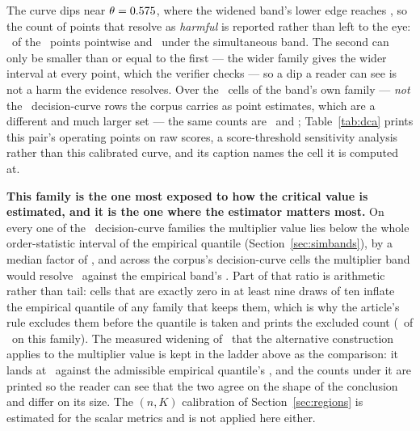 The curve dips near $\theta = 0.575$, where the widened band's
lower edge reaches \dcaDipValueWidened, so the count of points that resolve as
\emph{harmful} is reported rather than left to the eye:
\nHarmfulPointwise\ of the \nDcGrid\ points pointwise and
\nHarmfulSimultaneousWidened\ under the simultaneous band. The second can only be
smaller than or equal to the first --- the wider family gives the wider
interval at every point, which the verifier checks --- so a dip a
reader can see is not a harm the evidence resolves. Over the
\nDcaFamily\ cells of the band's own family --- \emph{not} the
\nDcaRows\ decision-curve rows the corpus carries as point estimates, which
are a different and much larger set --- the same counts are
\dcaHarmfulPointwise\ and \dcaHarmfulSimultaneousWidened; Table~\ref{tab:dca}
prints this pair's operating points on raw scores, a score-threshold
sensitivity analysis rather than this calibrated curve, and its caption
names the cell it is computed at.

\textbf{This family is the one most exposed to how the critical value is
estimated, and it is the one where the estimator matters most.} On every
one of the \nFamiliesDca\ decision-curve families the multiplier value lies
below the whole order-statistic interval of the empirical quantile
(Section~\ref{sec:simbands}), by a median factor of \qRatioDcaMedian, and
across the corpus's decision-curve cells the multiplier band would resolve
\nResolvedDcaMult\ against the empirical band's \nResolvedDcaEmp. Part of
that ratio is arithmetic rather than tail: cells that are exactly zero in at
least nine draws of ten inflate the empirical quantile of any family that
keeps them, which is why the article's rule excludes them before the
quantile is taken and prints the excluded count (\nDcaCellsExcludedDegenerate\
of \nDcaFamily\ on this family). The measured widening of
\dcaWidenFactor\ that the alternative construction applies to the multiplier
value is kept in the ladder above as the comparison: it lands at
\dcaQWidened\ against the admissible empirical quantile's \dcaQEmp, and the
counts under it are printed so the reader can see that the two agree on the
shape of the conclusion and differ on its size. The $(n,K)$ calibration of
Section~\ref{sec:regions} is estimated for the scalar metrics and is not
applied here either.


